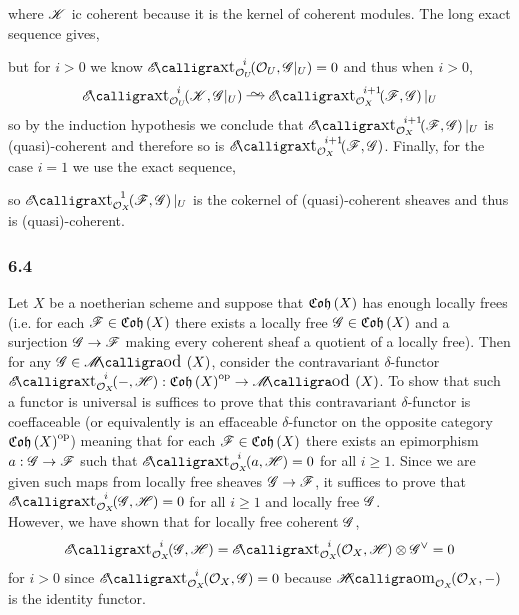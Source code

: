 \documentclass[12pt]{article}
\begin{document}
where $\mathscr{K}$ ic coherent because it is the kernel of coherent modules. The long exact sequence gives,
\begin{center}
\end{center}
but for $i > 0$ we know $\shExt{i}{\struct{U}}{\struct{U}}{\G|_U} = 0$ and thus when $i > 0$,
\[ \shExt{i}{\struct{U}}{\K}{\G|_U} \iso \shExt{i+1}{\struct{X}}{\F}{\G}|_U \]
so by the induction hypothesis we conclude that $\shExt{i+1}{\struct{X}}{\F}{\G}|_U$ is (quasi)-coherent and therefore so is $\shExt{i+1}{\struct{X}}{\F}{\G}$. Finally, for the case $i = 1$ we use the exact sequence,
\begin{center}
\end{center}
so $\shExt{1}{\struct{X}}{\F}{\G}|_U$ is the cokernel of (quasi)-coherent sheaves and thus is (quasi)-coherent.

\subsubsection{6.4}

Let $X$ be a noetherian scheme and suppose that $\mathfrak{Coh}\left(X\right)$ has enough locally frees (i.e. for each $\mathscr{F} \in \mathfrak{Coh}\left(X\right)$ there exists a locally free $\mathscr{G} \in \mathfrak{Coh}\left(X\right)$ and a surjection $\mathscr{G} \to \mathscr{F}$ making every coherent sheaf a quotient of a locally free). Then for any $\G \in \shMod{X}$, consider the contravariant $\delta$-functor $\shExt{i}{\struct{X}}{-}{\H} : \Coh{X}^{\op} \to \shMod{X}$. To show that such a functor is universal is suffices to prove that this contravariant $\delta$-functor is coeffaceable (or equivalently is an effaceable $\delta$-functor on the opposite category $\mathfrak{Coh}\left(X\right)^{\mathrm{op}}$) meaning that for each $\mathscr{F} \in \mathfrak{Coh}\left(X\right)$ there exists an epimorphism $a : \mathscr{G} \to \mathscr{F}$ such that $\shExt{i}{\struct{X}}{a}{\H} = 0$ for all $i \ge 1$. Since we are given such maps from locally free sheaves $\mathscr{G} \to \mathscr{F}$, it suffices to prove that $\shExt{i}{\struct{X}}{\G}{\H} = 0$ for all $i \ge 1$ and locally free $\mathscr{G}$. 
\bigskip\\
However, we have shown that for locally free coherent $\mathscr{G}$,
\[ \shExt{i}{\struct{X}}{\G}{\H} = \shExt{i}{\struct{X}}{\struct{X}}{\H} \otimes \G^\vee = 0 \]
for $i > 0$ since $\shExt{i}{\struct{X}}{\struct{X}}{\G} = 0$ because $\shHomover{\struct{X}}{\struct{X}}{-}$ is the identity functor. 
\end{document}
